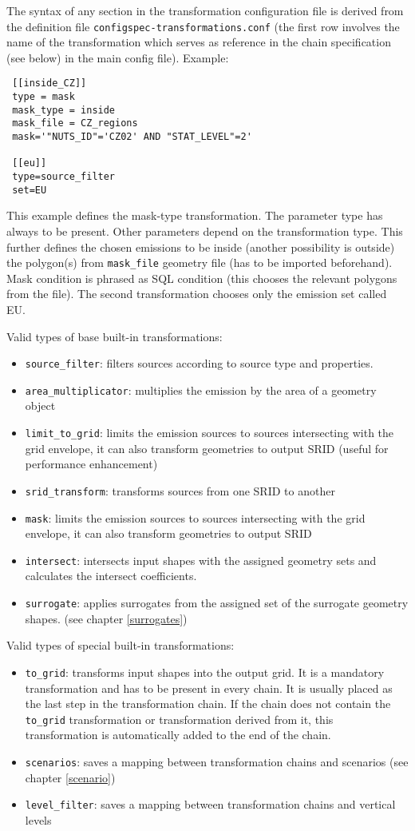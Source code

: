 \documentclass[a4paper,11pt]{article}
\begin{document}
The syntax of any section in the transformation configuration file is
derived from the definition file \verb|configspec-transformations.conf| (the first row involves the name of the transformation which serves as
reference in the chain specification (see below) in the main config
file). Example:
\begin{verbatim}
 [[inside_CZ]]
 type = mask 
 mask_type = inside 
 mask_file = CZ_regions
 mask='"NUTS_ID"='CZ02' AND "STAT_LEVEL"=2'

 [[eu]]
 type=source_filter
 set=EU
\end{verbatim}
This example defines the mask-type transformation. The parameter type has always to be present. Other parameters depend on the transformation type. This further defines the chosen emissions to be inside (another possibility is outside) the polygon(s) from \verb|mask_file| geometry file (has to be imported beforehand). Mask condition is phrased as SQL condition (this chooses the relevant polygons from the file). The second transformation chooses only the emission set called EU.

Valid types of base built-in transformations:
\begin{itemize}
\item \verb|source_filter|: filters sources according to source type and properties.
\item \verb|area_multiplicator|: multiplies the emission by the area of a geometry object
\item \verb|limit_to_grid|: limits the emission sources to sources intersecting with the grid envelope, it can also transform geometries to output SRID (useful for performance enhancement)
\item \verb|srid_transform|: transforms sources from one SRID to another
\item \verb|mask|: limits the emission sources to sources intersecting with the grid envelope, it can also transform geometries to output SRID
\item \verb|intersect|: intersects input shapes with the assigned geometry sets and calculates the intersect coefficients.
\item \verb|surrogate|: applies surrogates from the assigned set of the surrogate geometry shapes. (see chapter \ref{surrogates})
\end{itemize}

Valid types of special built-in transformations:
\begin{itemize}
\item \verb|to_grid|: transforms input shapes into the output grid.
    It is a mandatory transformation and has to be present in every chain. It is usually placed as the last step in the transformation chain. If the chain does not contain the \verb|to_grid| transformation or transformation derived from it, this transformation is automatically added to the end of the chain.
\item \verb|scenarios|: saves a mapping between transformation chains and scenarios (see chapter \ref{scenario})
\item \verb|level_filter|: saves a mapping between transformation chains and vertical levels
\end{itemize}
\end{document}
